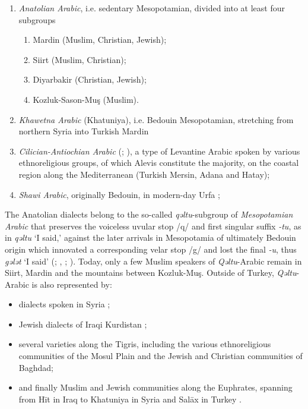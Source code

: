\documentclass[output=paper,colorlinks,citecolor=brown,draftmode]{langscibook}
\begin{document}
\begin{enumerate}
    \item \textit{Anatolian Arabic}, i.e. sedentary Mesopotamian, divided into at least four subgroups
    \begin{enumerate}
        \item Mardin (Muslim, Christian, Jewish);
        \item Siirt (Muslim, Christian);
        \item Diyarbakir (Christian, Jewish);
        \item Kozluk-Sason-Muş (Muslim).
    \end{enumerate}
    \item \textit{Khawetna Arabic} (Khatuniya), i.e. Bedouin Mesopotamian, stretching from northern Syria into Turkish Mardin \citep{Talay1999AKhawetnaG}
    \item \textit{Cilician-Antiochian Arabic} (\citealt{Arnold1998AAntioch}; \citealt{Prochazka2002ACukurova}), a type of Levantine Arabic spoken by various ethnoreligious groups, of which Alevis constitute the majority, on the coastal region along the Mediterranean (Turkish Mersin, Adana and Hatay);
    \item \textit{Shawi Arabic}, originally Bedouin, in modern-day Urfa \citep{Prochazka2003Bed};
\end{enumerate}

\begin{sloppypar}
The Anatolian dialects belong to the so-called \textit{qəltu}-subgroup of \textit{Mesopotamian Arabic} that preserves the voiceless uvular stop /q/ and first singular suffix \textit{-tu}, as in \textit{qəltu} `I said,' against the later arrivals in Mesopotamia of ultimately Bedouin origin which innovated a corresponding velar stop /g/ and lost the final \textit{-u}, thus \textit{gələt} `I said' (\citealt{Blanc1964CDBaghdad}; \citealt{Jastrow1978MAqetlu1}, \citeyear{Jastrow2006ATurkey}; \citealt{Talay2012AMesopotamia}). Today, only a few Muslim speakers of \textit{Qəltu}-Arabic remain in Siirt, Mardin and the mountains between Kozluk-Muş. Outside of Turkey, \textit{Qəltu}-Arabic is also represented by: 
\end{sloppypar}

\begin{itemize}
    \item dialects spoken in Syria \citep{Behnstedt1992};
    \item Jewish dialects of Iraqi Kurdistan \citep{Jastrow1990JAAqraArbil}; 
    \item several varieties along the Tigris, including the various ethnoreligious communities of the Mosul Plain \citep{Jastrow1979AMosul} and the Jewish \citep{BarMoshe2019JAB} and Christian \citep{AbuHaidar1991CABaghdad} communities of Baghdad; 
    \item and finally Muslim and Jewish communities along the Euphrates, spanning from Hīt in Iraq to Khatuniya in Syria and Salāx in Turkey \citep{Talay1999AKhawetnaG}.
\end{itemize}
\end{document}
